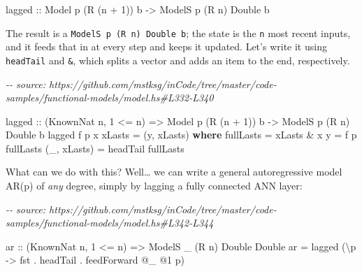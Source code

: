 \documentclass[]{article}
\newenvironment{Shaded}{}{}
\newcommand{\CommentTok}[1]{\textcolor[rgb]{0.38,0.63,0.69}{\textit{#1}}}
\newcommand{\DataTypeTok}[1]{\textcolor[rgb]{0.56,0.13,0.00}{#1}}
\newcommand{\DecValTok}[1]{\textcolor[rgb]{0.25,0.63,0.44}{#1}}
\newcommand{\FunctionTok}[1]{\textcolor[rgb]{0.02,0.16,0.49}{#1}}
\newcommand{\KeywordTok}[1]{\textcolor[rgb]{0.00,0.44,0.13}{\textbf{#1}}}
\newcommand{\NormalTok}[1]{#1}
\newcommand{\OperatorTok}[1]{\textcolor[rgb]{0.40,0.40,0.40}{#1}}
\newcommand{\OtherTok}[1]{\textcolor[rgb]{0.00,0.44,0.13}{#1}}
\begin{document}
\begin{Shaded}
\begin{Highlighting}[]
\OtherTok{lagged ::} \DataTypeTok{Model}\NormalTok{  p       (}\DataTypeTok{R}\NormalTok{ (n }\OperatorTok{+} \DecValTok{1}\NormalTok{)) b}
       \OtherTok{{-}\textgreater{}} \DataTypeTok{ModelS}\NormalTok{ p (}\DataTypeTok{R}\NormalTok{ n) }\DataTypeTok{Double}\NormalTok{      b}
\end{Highlighting}
\end{Shaded}

The result is a \texttt{ModelS\ p\ (R\ n)\ Double\ b}; the state is the
\texttt{n} most recent inputs, and it feeds that in at every step and keeps it
updated. Let's write it using \texttt{headTail} and \texttt{\&}, which splits a
vector and adds an item to the end, respectively.

\begin{Shaded}
\begin{Highlighting}[]
\CommentTok{{-}{-} source: https://github.com/mstksg/inCode/tree/master/code{-}samples/functional{-}models/model.hs\#L332{-}L340}

\NormalTok{lagged}
\OtherTok{    ::}\NormalTok{ (}\DataTypeTok{KnownNat}\NormalTok{ n, }\DecValTok{1} \OperatorTok{\textless{}=}\NormalTok{ n)}
    \OtherTok{=\textgreater{}} \DataTypeTok{Model}\NormalTok{  p       (}\DataTypeTok{R}\NormalTok{ (n }\OperatorTok{+} \DecValTok{1}\NormalTok{)) b}
    \OtherTok{{-}\textgreater{}} \DataTypeTok{ModelS}\NormalTok{ p (}\DataTypeTok{R}\NormalTok{ n) }\DataTypeTok{Double}\NormalTok{      b}
\NormalTok{lagged f p x xLasts }\OtherTok{=}\NormalTok{ (y, xLasts\textquotesingle{})}
  \KeywordTok{where}
\NormalTok{    fullLasts    }\OtherTok{=}\NormalTok{ xLasts }\OperatorTok{\&}\NormalTok{ x}
\NormalTok{    y            }\OtherTok{=}\NormalTok{ f p fullLasts}
\NormalTok{    (\_, xLasts\textquotesingle{}) }\OtherTok{=}\NormalTok{ headTail fullLasts}
\end{Highlighting}
\end{Shaded}

What can we do with this? Well\ldots{} we can write a general autoregressive
model AR(p) of \emph{any} degree, simply by lagging a fully connected ANN layer:

\begin{Shaded}
\begin{Highlighting}[]
\CommentTok{{-}{-} source: https://github.com/mstksg/inCode/tree/master/code{-}samples/functional{-}models/model.hs\#L342{-}L344}

\OtherTok{ar ::}\NormalTok{ (}\DataTypeTok{KnownNat}\NormalTok{ n, }\DecValTok{1} \OperatorTok{\textless{}=}\NormalTok{ n)}
   \OtherTok{=\textgreater{}} \DataTypeTok{ModelS}\NormalTok{ \_ (}\DataTypeTok{R}\NormalTok{ n) }\DataTypeTok{Double} \DataTypeTok{Double}
\NormalTok{ar }\OtherTok{=}\NormalTok{ lagged (\textbackslash{}p }\OtherTok{{-}\textgreater{}} \FunctionTok{fst} \OperatorTok{.}\NormalTok{ headTail }\OperatorTok{.}\NormalTok{ feedForward }\OperatorTok{@}\NormalTok{\_ }\OperatorTok{@}\DecValTok{1}\NormalTok{ p)}
\end{Highlighting}
\end{Shaded}
\end{document}
